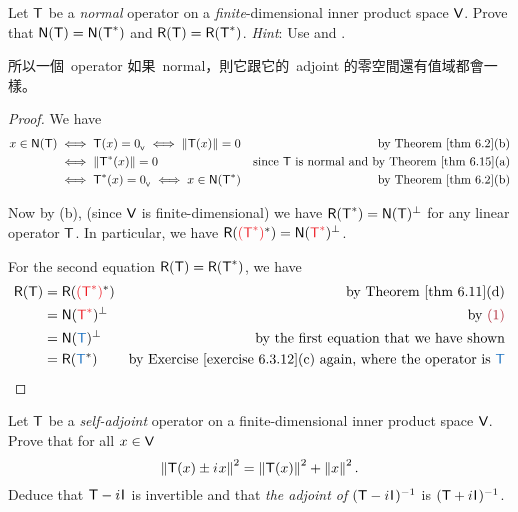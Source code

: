 \begin{exercise} \label{exercise 6.4.9}
Let \(\textsf{T}\) be a \emph{normal} operator on a \emph{finite}-dimensional inner product space \(\textsf{V}\).
Prove that \(\textsf{N}(\textsf{T}) = \textsf{N}(\textsf{T}^*)\) and \(\textsf{R}(\textsf{T}) = \textsf{R}(\textsf{T}^*)\).
\emph{Hint}: Use  and .
\end{exercise}

\begin{note}
所以一個\ operator 如果\ normal，則它跟它的\ adjoint 的零空間還有值域都會一樣。
\end{note}

\begin{proof}
We have
\begin{align*}
    x \in \NULLT & \iff \T(x) = \OV \iff \norm{\T(x)} = 0 & \text{by \THM{6.2}(b)} \\
        & \iff \norm{\T^*(x)} = 0 & \text{since \(\T\) is normal and by \THM{6.15}(a)} \\
        & \iff \T^*(x) = \OV \iff x \in \NULL(\T^*) & \text{by \THM{6.2}(b)}
\end{align*}

Now by (b), (since \(\textsf{V}\) is finite-dimensional) we have \(\textsf{R}(\textsf{T}^*) = \textsf{N}(\textsf{T})^{\perp}\) for any linear operator \(\textsf{T}\).
In particular, we have \(\RANGE(\RED{(\T^*)}^*) = \NULL(\RED{\T^*})^{\perp}\). 

For the second equation \(\textsf{R}(\textsf{T}) = \textsf{R}(\textsf{T}^*)\), we have
\begin{align*}
    \RANGET & = \RANGE(\RED{(\T^*)}^*) & \text{by \THM{6.11}(d)} \\
        & = \NULL(\RED{\T^*})^{\perp} & \text{by \MAROON{(1)}} \\
        & = \NULL(\BLUE{\T})^{\perp} & \text{by the first equation that we have shown} \\
        & = \RANGE(\BLUE{\T}^*) & \text{by \EXEC{6.3.12}(c) again, where the operator is \(\BLUE{\T}\)}
\end{align*}
\end{proof}

\begin{exercise} \label{exercise 6.4.10}
Let \(\textsf{T}\) be a \emph{self-adjoint} operator on a finite-dimensional inner product space \(\textsf{V}\).
Prove that for all \(x \in \textsf{V}\)
\[
    \left\lVert\textsf{T}(x) \pm {i\mkern1mu} x\right\rVert^2 = \left\lVert\textsf{T}(x)\right\rVert^2 + \left\lVert x\right\rVert^2.
\]
Deduce that \(\textsf{T} - {i\mkern1mu} \textsf{I}_{_{}}\) is invertible and that \emph{the adjoint of} \((\textsf{T} - {i\mkern1mu} \textsf{I}_{_{}})^{-1}\) is \((\textsf{T} + {i\mkern1mu} \textsf{I}_{_{}})^{-1}\).
\end{exercise}

